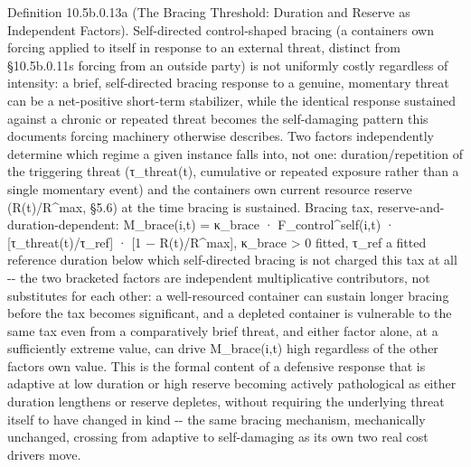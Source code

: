 \documentclass[
]{article}
\begin{document}
Definition 10.5b.0.13a (The Bracing Threshold: Duration and Reserve as
Independent Factors). Self-directed control-shaped bracing (a containers
own forcing applied to itself in response to an external threat,
distinct from §10.5b.0.11s forcing from an outside party) is not
uniformly costly regardless of intensity: a brief, self-directed bracing
response to a genuine, momentary threat can be a net-positive short-term
stabilizer, while the identical response sustained against a chronic or
repeated threat becomes the self-damaging pattern this documents forcing
machinery otherwise describes. Two factors independently determine which
regime a given instance falls into, not one: duration/repetition of the
triggering threat (τ\_threat(t), cumulative or repeated exposure rather
than a single momentary event) and the containers own current resource
reserve (R(t)/R\^{}max, §5.6) at the time bracing is sustained. Bracing
tax, reserve-and-duration-dependent: M\_brace(i,t) = κ\_brace ·
F\_control\^{}self(i,t) · {[}τ\_threat(t)/τ\_ref{]} · {[}1 −
R(t)/R\^{}max{]}, κ\_brace \textgreater{} 0 fitted, τ\_ref a fitted
reference duration below which self-directed bracing is not charged this
tax at all -\/- the two bracketed factors are independent multiplicative
contributors, not substitutes for each other: a well-resourced container
can sustain longer bracing before the tax becomes significant, and a
depleted container is vulnerable to the same tax even from a
comparatively brief threat, and either factor alone, at a sufficiently
extreme value, can drive M\_brace(i,t) high regardless of the other
factors own value. This is the formal content of a defensive response
that is adaptive at low duration or high reserve becoming actively
pathological as either duration lengthens or reserve depletes, without
requiring the underlying threat itself to have changed in kind -\/- the
same bracing mechanism, mechanically unchanged, crossing from adaptive
to self-damaging as its own two real cost drivers move.
\end{document}
